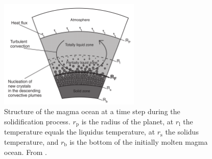 \documentclass[abstract=on, letterpaper]{scrartcl}
\numberwithin{equation}{section}
\begin{document}
\begin{figure}[H]
	\label{struc_magma}
	\includegraphics[width=0.6\textwidth]{../Fig_StructMagmaOcean/struc_magma}
	\caption{Structure of the magma ocean at a time step during the solidification process. $r_\mathrm{p}$ is the radius of the planet, at $r_\mathrm{l}$ the temperature equals the liquidus temperature, at $r_\mathrm{s}$ the solidus temperature, and $r_\mathrm{b}$ is the bottom of the initially molten magma ocean. From \citet{Lebrun2013}.}
\end{figure}
\end{document}
